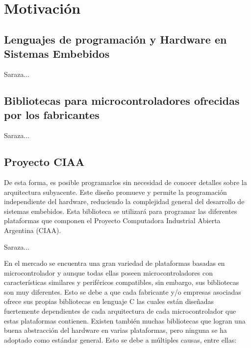 \section{Motivación}
\label{sec:motivacion}


\subsection{Lenguajes de programación y Hardware en Sistemas Embebidos}

Saraza...


\subsection{Bibliotecas para microcontroladores ofrecidas por los fabricantes}

Saraza...

\subsection{Proyecto CIAA}

De esta forma, es posible programarlos sin necesidad de conocer detalles sobre
la arquitectura subyacente. Este diseño promueve y permite la programación 
independiente del hardware, reduciendo la complejidad general del desarrollo de
sistemas embebidos. Esta biblioteca se utilizará para programar las diferentes
plataformas que componen el Proyecto Computadora Industrial Abierta Argentina 
(CIAA).


Saraza...



En el mercado se encuentra una gran variedad de plataformas basadas en microcontrolador y aunque todas ellas poseen microcontroladores con características similares y periféricos compatibles, sin embargo, sus bibliotecas son muy diferentes. Esto se debe a que cada fabricante y/o empresas asociadas ofrece sus propias bibliotecas en lenguaje C las cuales están diseñadas fuertemente dependientes de cada arquitectura de cada microcontrolador que estas plataformas contienen.
Existen también muchas bibliotecas que logran una buena abstracción del hardware en varias plataformas, pero ninguna se ha adoptado como estándar general. Esto se debe a múltiples causas, entre ellas:


